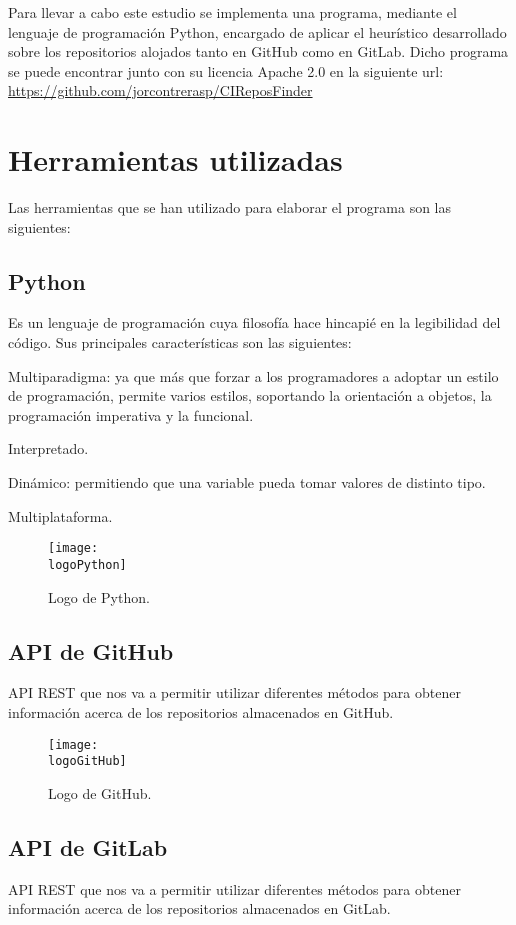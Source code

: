 Para llevar a cabo este estudio se implementa una programa, mediante el lenguaje de programación Python, encargado de aplicar el heurístico desarrollado sobre los repositorios alojados tanto en GitHub como en GitLab.
Dicho programa se puede encontrar junto con su licencia Apache 2.0 en la siguiente url:\\
\url{https://github.com/jorcontrerasp/CIReposFinder}

\section{Herramientas utilizadas}
Las herramientas que se han utilizado para elaborar el programa son las siguientes:
\subsection{Python}
Es un lenguaje de programación cuya filosofía hace hincapié en la legibilidad del código. Sus principales características son las siguientes:
\begin{compactitem}
    \item Multiparadigma: ya que más que forzar a los programadores a adoptar un estilo de programación, permite varios estilos, soportando la orientación a objetos, la programación imperativa y la funcional.
    \item Interpretado.
    \item Dinámico: permitiendo que una variable pueda tomar valores de distinto tipo.
    \item Multiplataforma.
\end{compactitem}

\begin{figure}[h]
    \centering
    \texttt{[image: \\logoPython]}
    \caption{Logo de Python.}
\end{figure}

\subsection{API de GitHub}
API REST que nos va a permitir utilizar diferentes métodos para obtener información acerca de los repositorios almacenados en GitHub.

\begin{figure}[h]
    \centering
    \texttt{[image: \\logoGitHub]}
    \caption{Logo de GitHub.}
\end{figure}

\subsection{API de GitLab}
API REST que nos va a permitir utilizar diferentes métodos para obtener información acerca de los repositorios almacenados en GitLab.

